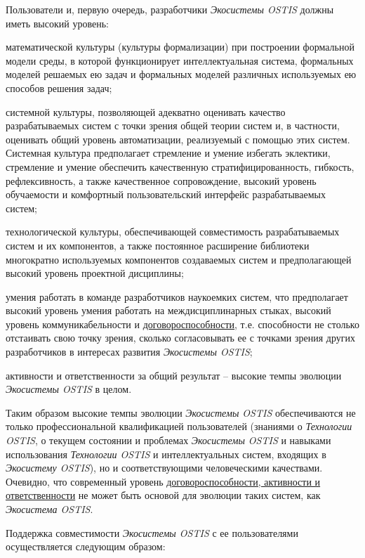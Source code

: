 \begin{SCn}
{Пользователи и, первую очередь, разработчики \textit{Экосистемы OSTIS}  должны иметь высокий уровень:
\begin{scnitemize}
\item математической культуры (культуры формализации) при построении формальной модели среды, в которой функционирует интеллектуальная система, формальных моделей решаемых ею задач и формальных моделей различных используемых ею способов решения задач;
\item системной культуры, позволяющей адекватно оценивать качество разрабатываемых систем с точки зрения общей теории систем и, в частности, оценивать общий уровень автоматизации, реализуемый с помощью этих систем. Системная культура предполагает стремление и умение избегать эклектики, стремление и умение обеспечить качественную стратифицированность, гибкость, рефлексивность, а также качественное сопровождение, высокий уровень обучаемости и комфортный пользовательский интерфейс разрабатываемых систем;
\item технологической культуры, обеспечивающей совместимость разрабатываемых систем и их компонентов, а также постоянное расширение библиотеки многократно используемых компонентов создаваемых систем и предполагающей высокий уровень проектной дисциплины;
\item умения работать в команде разработчиков наукоемких систем, что предполагает высокий уровень умения работать на междисциплинарных стыках, высокий уровень коммуникабельности и \uline{договороспособности}, т.е. способности не столько отстаивать свою точку зрения, сколько согласовывать ее  с точками зрения других разработчиков в интересах развития \textit{Экосистемы OSTIS};
\item активности и ответственности за общий результат -- высокие темпы эволюции \textit{Экосистемы OSTIS} в целом.
\end{scnitemize}

Таким образом высокие темпы эволюции \textit{Экосистемы OSTIS} обеспечиваются не только профессиональной квалификацией пользователей (знаниями о \textit{Технологии OSTIS}, о текущем состоянии и проблемах \textit{Экосистемы OSTIS} и навыками использования \textit{Технологии OSTIS} и интеллектуальных систем, входящих в \textit{Экосистему OSTIS}), но и соответствующими человеческими качествами. Очевидно, что современный уровень \uline{договороспособности, активности и ответственности} не может быть основой для эволюции таких систем, как \textit{Экосистема OSTIS}.

Поддержка совместимости \textit{Экосистемы OSTIS} с ее пользователями осуществляется следующим образом:


}
\end{SCn}
